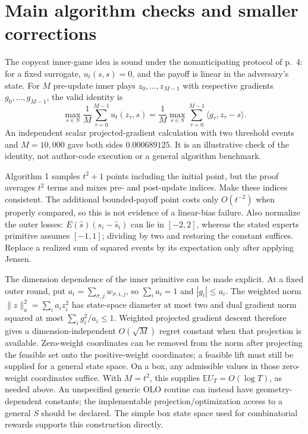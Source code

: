 \documentclass[10pt]{article}
\begin{document}
\section*{Main algorithm checks and smaller corrections}
The copycat inner-game idea is sound under the nonanticipating protocol of p. 4: for a fixed surrogate, \(u_t(s,s)=0\), and the payoff is linear in the adversary’s state. For \(M\) pre-update inner plays \(z_0,\ldots,z_{M-1}\) with respective gradients \(g_0,\ldots,g_{M-1}\), the valid identity is \[\max_{s\in S}\frac1M\sum_{\tau=0}^{M-1}u_t(z_\tau,s)
 =\frac1M\max_{s\in S}\sum_{\tau=0}^{M-1}\langle g_\tau,z_\tau-s\rangle.\] An independent scalar projected-gradient calculation with two threshold events and \(M=10{,}000\) gave both sides \(0.000689125\). It is an illustrative check of the identity, not author-code execution or a general algorithm benchmark.\par
Algorithm 1 samples \(t^2+1\) points including the initial point, but the proof averages \(t^2\) terms and mixes pre- and post-update indices. Make these indices consistent. The additional bounded-payoff point costs only \(O(t^{-2})\) when properly compared, so this is not evidence of a linear-bias failure. Also normalize the outer losses: \(E(\widehat s)(s_i-\widehat s_i)\) can lie in \([-2,2]\), whereas the stated experts primitive assumes \([-1,1]\); dividing by two and restoring the constant suffices. Replace a realized sum of squared events by its expectation only after applying Jensen.\par
The dimension dependence of the inner primitive can be made explicit. At a fixed outer round, put \(a_i=\sum_{\sigma,j}w_{\sigma,i,j}\), so \(\sum_i a_i=1\) and \(|g_i|\leq a_i\). The weighted norm \(\|z\|_a^2=\sum_i a_i z_i^2\) has state-space diameter at most two and dual gradient norm squared at most \(\sum_i g_i^2/a_i\leq1\). Weighted projected gradient descent therefore gives a dimension-independent \(O(\sqrt M)\) regret constant when that projection is available. Zero-weight coordinates can be removed from the norm after projecting the feasible set onto the positive-weight coordinates; a feasible lift must still be supplied for a general state space. On a box, any admissible values in those zero-weight coordinates suffice. With \(M=t^2\), this supplies \(\mathbb E U_T=O(\log T)\), as needed above. An unspecified generic OLO routine can instead have geometry-dependent constants; the implementable projection/optimization access to a general \(S\) should be declared. The simple box state space used for combinatorial rewards supports this construction directly.\par
\end{document}
